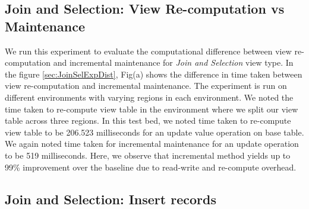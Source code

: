 \documentclass[11pt,a4paper,bibtotoc,idxtotoc,headsepline,footsepline,footexclude,BCOR12mm,DIV13]{scrbook}
\begin{document}
\subsection{Join and Selection: View Re-computation vs Maintenance}
\label{Join and Selection: View Re-computation vs Maintenance Distributed}

We run this experiment to evaluate the computational difference between view re-computation and incremental maintenance for \emph{Join and Selection} view type. In the figure \ref{sec:JoinSelExpDist}, Fig(a) shows the difference in time taken between view re-computation and incremental maintenance. The experiment is run on different environments with varying regions in each environment. We noted the time taken to re-compute view table in the environment where we split our view table across three regions. In this test bed, we noted time taken to re-compute view table to be 206.523 milliseconds for an update value operation on base table. We again noted time taken for incremental maintenance for an update operation to be 519 milliseconds. Here, we observe that incremental method yields up to 99\% improvement over the baseline due to read-write and re-compute overhead.


\subsection{Join and Selection: Insert records}
\label{Join and Selection: Insert Records Distributed}
\end{document}
